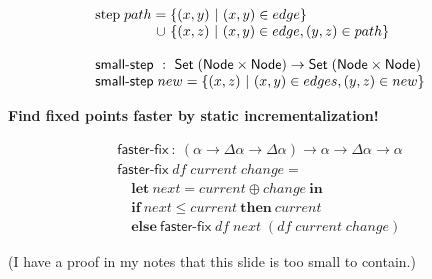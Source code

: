 \documentclass[dvipsnames]{beamer}
\newcommand\x\times
\newcommand{\ms}{\mathsf}
\newcommand{\mb}{\mathbf}
\newcommand{\setfor}[2]{\{#1 ~|~ #2\}}
\begin{document}
\begin{frame}

  \pause
  \large
  \[\begin{array}{l}
    \text{step}\; path =
    \setfor{(x,y)}{(x,y) \in edge}\\
    \phantom{\text{step}\;path} \hspace{1.15pt}\cup\hspace{1.15pt}
    \setfor{(x,z)}{(x,y) \in edge, (y,z) \in path}\\
    \\
    \textsf{small-step} ~:~ \ms{Set}\;(\ms{Node} \x \ms{Node})
    \to \ms{Set}\;(\ms{Node} \x \ms{Node})\\
    \textsf{small-step} \; new =
    \setfor{(x,z)}{(x,y) \in edges, (y,z) \in new}\\
  \end{array}\]
  \vspace{0cm}

  \pause
  \huge\bf Find fixed points faster by static incrementalization!
\end{frame}


\begin{frame}
  \large
  \[\begin{array}{l}
  \textsf{faster-fix} ~:~ (\alpha \to \Delta \alpha \to \Delta \alpha)
  \to \alpha \to \Delta \alpha \to \alpha\\
  \textsf{faster-fix} \; df \; current \; change =\\
  \quad \mb{let}~ next = current \oplus change ~\mb{in}\\
  \quad \mb{if}~ next \le current ~\mb{then}~ current\\
  \quad \mb{else}~ \textsf{faster-fix} \; df \; next \; (df \; current \; change)
  \end{array}\]



  \vspace{0.5cm}

  \small (I have a proof in my notes that
  this slide is too small to contain.)
\end{frame}
\end{document}
